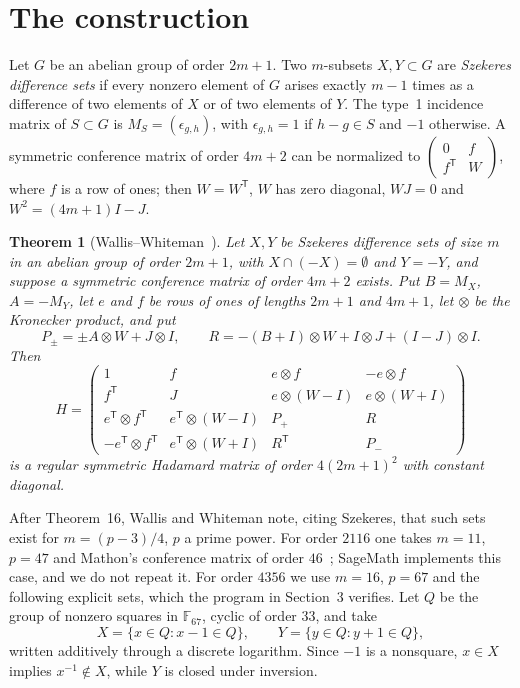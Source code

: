 \documentclass[10pt]{article}
\newtheorem{theorem}{Theorem}
\newcommand{\F}{\mathbb F}
\begin{document}
\section{The construction}
Let $G$ be an abelian group of order $2m+1$. Two $m$-subsets $X,Y\subset G$ are \emph{Szekeres difference sets} if every nonzero element of $G$ arises exactly $m-1$ times as a difference of two elements of $X$ or of two elements of $Y$. The type~1 incidence matrix of $S\subset G$ is $M_S=(\epsilon_{g,h})$, with $\epsilon_{g,h}=1$ if $h-g\in S$ and $-1$ otherwise. A symmetric conference matrix of order $4m+2$ can be normalized to $\left(\begin{smallmatrix}0&f\\ f^{\mathsf T}&W\end{smallmatrix}\right)$, where $f$ is a row of ones; then $W=W^{\mathsf T}$, $W$ has zero diagonal, $WJ=0$ and $W^2=(4m+1)I-J$.

\begin{theorem}[Wallis--Whiteman~{\cite[Theorem~16]{WW}}]
Let $X,Y$ be Szekeres difference sets of size $m$ in an abelian group of order $2m+1$, with $X\cap(-X)=\emptyset$ and $Y=-Y$, and suppose a symmetric conference matrix of order $4m+2$ exists. Put $B=M_X$, $A=-M_Y$, let $e$ and $f$ be rows of ones of lengths $2m+1$ and $4m+1$, let $\otimes$ be the Kronecker product, and put
\[
P_\pm=\pm A\otimes W+J\otimes I,\qquad R=-(B+I)\otimes W+I\otimes J+(I-J)\otimes I.
\]
Then
\[
H=\begin{pmatrix}
1 & f & e\otimes f & -e\otimes f\\
f^{\mathsf T} & J & e\otimes(W-I) & e\otimes(W+I)\\
e^{\mathsf T}\otimes f^{\mathsf T} & e^{\mathsf T}\otimes(W-I) & P_+ & R\\
-e^{\mathsf T}\otimes f^{\mathsf T} & e^{\mathsf T}\otimes(W+I) & R^{\mathsf T} & P_-
\end{pmatrix}
\]
is a regular symmetric Hadamard matrix of order $4(2m+1)^2$ with constant diagonal.
\end{theorem}

After Theorem~16, Wallis and Whiteman note, citing Szekeres, that such sets exist for $m=(p-3)/4$, $p$ a prime power. For order $2116$ one takes $m=11$, $p=47$ and Mathon's conference matrix of order $46$~\cite{M78}; SageMath implements this case, and we do not repeat it. For order $4356$ we use $m=16$, $p=67$ and the following explicit sets, which the program in Section~3 verifies. Let $Q$ be the group of nonzero squares in $\F_{67}$, cyclic of order $33$, and take
\[
X=\{x\in Q: x-1\in Q\},\qquad Y=\{y\in Q: y+1\in Q\},
\]
written additively through a discrete logarithm. Since $-1$ is a nonsquare, $x\in X$ implies $x^{-1}\notin X$, while $Y$ is closed under inversion.
\end{document}
